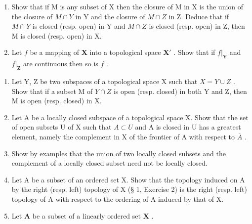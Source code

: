 \begin{enumerate}
\def\labelenumi{\alph{enumi})}
\item
  Show that if M is any subset of X then the closure of M in X is the union of the closure of \(M \cap Y\) in Y and the closure of \(M \cap Z\) in Z. Deduce that if \(M \cap Y\) is closed (resp. open) in Y and \(M \cap Z\) is closed (resp. open) in Z, then M is closed (resp. open) in X.
\item
  Let \(f\) be a mapping of \(\mathbf{X}\) into a topological space \(\mathbf{X}'\) . Show that if \(f|_{\mathbf{Y}}\) and \(f|_{\mathbf{Z}}\) are continuous then so is \(f\) .
\end{enumerate}

\begin{enumerate}
\def\labelenumi{\arabic{enumi})}
\setcounter{enumi}{4}
\item
  Let Y, Z be two subspaces of a topological space X such that \(X = Y \cup Z\) . Show that if a subset M of \(Y \cap Z\) is open (resp. closed) in both Y and Z, then M is open (resp. closed) in X.
\item
  Let A be a locally closed subspace of a topological space X. Show that the set of open subsets U of X such that \(A \subset U\) and A is closed in U has a greatest element, namely the complement in X of the frontier of A with respect to \(\overline{A}\) .
\item
  Show by examples that the union of two locally closed subsets and the complement of a locally closed subset need not be locally closed.
\item
  Let A be a subset of an ordered set X. Show that the topology induced on A by the right (resp. left) topology of X (§ 1, Exercise 2) is the right (resp. left) topology of A with respect to the ordering of A induced by that of X.
\item
  Let \(\mathbf{A}\) be a subset of a linearly ordered set \(\mathbf{X}\) .
\end{enumerate}


